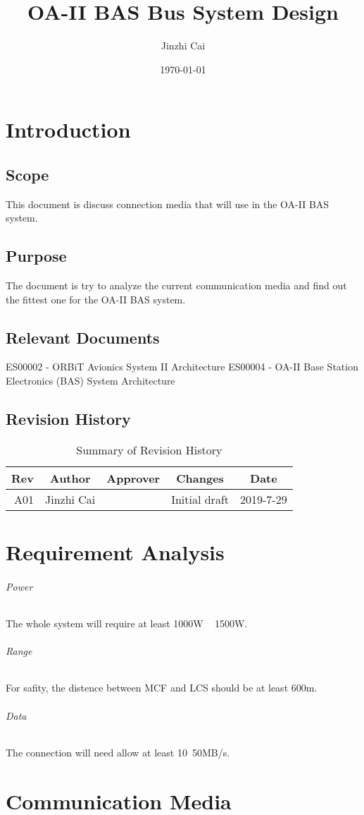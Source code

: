\documentclass[12pt,article]{memoir}
\title{OA-II BAS Bus System Design}
\author{Jinzhi Cai}
\date{\today}
\begin{document}
	


\tableofcontents*
\clearpage


\chapter{Introduction}
\section{Scope}
This document is discuss connection media that will use in the OA-II BAS system.
\section{Purpose}
The document is try to analyze the current communication media and find out the fittest one for the OA-II BAS system.
\section{Relevant Documents}
ES00002 - ORBiT Avionics System II Architecture
ES00004 - OA-II Base Station Electronics (BAS) System Architecture
\section{Revision History}
\begin{table}[H]
	\centering
	\begin{tabu}{r || c | c | c | c }
		Rev & Author & Approver & Changes & Date\\ \hline
		A01 & Jinzhi Cai & & Initial draft & 2019-7-29 \\
	\end{tabu}
	\caption{Summary of Revision History}
	\label{tab:rev}
\end{table}
\newpage
\chapter{Requirement Analysis}
\subparagraph{Power} The whole system will require at least 1000W ~ 1500W.
\subparagraph{Range} For safity, the distence between MCF and LCS should be at least 600m.
\subparagraph{Data} The connection will need allow at least 10~50MB/s.

\newpage
\chapter{Communication Media}
\end{document}
